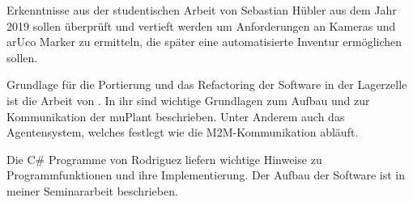     Erkenntnisse aus der studentischen Arbeit von Sebastian Hübler aus dem Jahr 2019 \cite{Hübler2019} sollen überprüft
    und vertieft werden um Anforderungen an Kameras und arUco Marker zu ermitteln, die später eine automatisierte
    Inventur ermöglichen sollen.

    Grundlage für die Portierung und das Refactoring der Software in der Lagerzelle ist die Arbeit von \cite{LarsKistner2017}.
    In ihr sind wichtige Grundlagen zum Aufbau und zur Kommunikation der muPlant beschrieben. Unter Anderem auch das Agentensystem, welches festlegt wie die M2M-Kommunikation abläuft.

    Die C\# Programme von Rodriguez liefern wichtige Hinweise zu Programmfunktionen und ihre Implementierung. 
    Der Aufbau der Software ist in meiner Seminararbeit beschrieben. 

